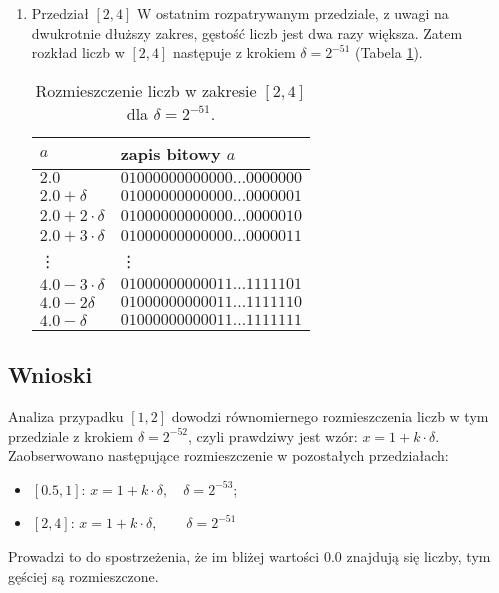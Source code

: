 \documentclass{classrep}
\begin{document}
\begin{enumerate}
		\item Przedział $[2,4]$
			\newline W ostatnim rozpatrywanym przedziale, z uwagi na dwukrotnie dłuższy zakres, gęstość liczb jest dwa razy większa.
   			Zatem rozkład liczb w $[2,4]$ następuje z krokiem $\delta = 2^{-51}$ (Tabela \ref{table:7}).
   			\begin{table}[!h]
        		\centering
        		\footnotesize
            	\begin{tabular}{ll} \toprule
                	$a$ & {zapis bitowy $a$} \\ \midrule
                		$2.0$ 			& $01000000000000\dots 0000000$ \\ 
 					$2.0+\delta$ 	& $01000000000000\dots 0000001$  \\
 					$2.0+2\cdot\delta$ & $01000000000000\dots 0000010$ \\
 					$2.0+3\cdot\delta$ & $01000000000000\dots 0000011$  \\
 					\vdots & \vdots \\
 					$4.0-3\cdot\delta$ & $01000000000011\dots 1111101$ \\
 					$4.0-2\delta$ & $01000000000011\dots 1111110$ \\
 					$4.0-\delta$ & $01000000000011\dots 1111111$ \\\bottomrule
            	\end{tabular}
            	\caption{Rozmieszczenie liczb w zakresie $[2,4]$ dla $\delta = 2^{-51}$.}
			\label{table:7}
   			\end{table}   			
		\end{enumerate}
	\subsection{Wnioski}
		Analiza przypadku $[1,2]$ dowodzi równomiernego rozmieszczenia liczb w tym przedziale z krokiem $\delta = 
		2^{-52}$, czyli prawdziwy jest wzór: $x=1+k\cdot\delta$. Zaobserwowano następujące rozmieszczenie w pozostałych 
		przedziałach:
		\begin{itemize}
			\item $[0.5,1]$: $x=1+k\cdot\delta, \quad \delta = 2^{-53}$;
			\item $[2,4]$: $x=1+k\cdot\delta, \qquad \delta = 2^{-51}$
		\end{itemize}
		Prowadzi to do spostrzeżenia, że im bliżej wartości $0.0$ znajdują się liczby, tym gęściej są rozmieszczone.
\end{document}
